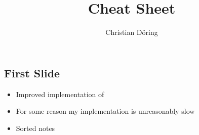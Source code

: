 \documentclass[ 6pt, a4paper, landscape ]{scrartcl}
\title{Cheat Sheet}
\author{Christian D\"oring}
\begin{document}
\maketitle

\begin{multicols}{4}

	
	\begin{breakbox}
		\section{First Slide}
\begin{itemize}
\item Improved implementation of
\item For some reason my implementation is unreasonably slow
\item Sorted notes\end{itemize}

\end{breakbox}
\end{multicols}
\end{document}
